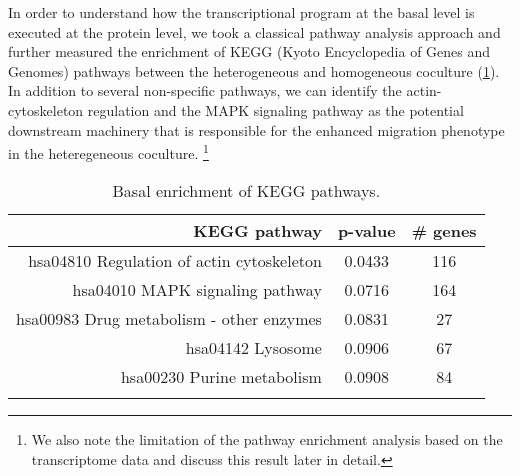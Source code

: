 In order to understand how the transcriptional program
at the basal level is executed at the protein level,
we took a classical pathway analysis approach and further 
measured
the enrichment of KEGG (Kyoto Encyclopedia of Genes and 
Genomes) pathways between the heterogeneous 
and homogeneous 
coculture (\ref{table:h838_gage_kegg}). 
In addition to several non-specific pathways, 
we can identify the actin-cytoskeleton regulation and 
the MAPK signaling pathway as the potential downstream 
machinery that is responsible for the enhanced migration
phenotype in the heteregeneous coculture.%
\footnote{We also note the limitation of the pathway 
enrichment analysis based on the transcriptome data and 
discuss this
result later in detail.} 

\begin{longtable}{rcc}
\caption{Basal enrichment of KEGG pathways.} \\ 
\hline
KEGG pathway & p-value & \# genes \\
\hline
\rowcolor{Gray} hsa04810 Regulation of actin cytoskeleton & 0.0433 &  116\\
hsa04010 MAPK signaling pathway &  0.0716 &   164\\
\rowcolor{Gray} hsa00983 Drug metabolism - other enzymes & 0.0831 &   27\\
hsa04142 Lysosome &  0.0906 &    67\\
\rowcolor{Gray} hsa00230 Purine metabolism &  0.0908 &  84\\
\hline
\label{table:h838_gage_kegg}
\end{longtable}


